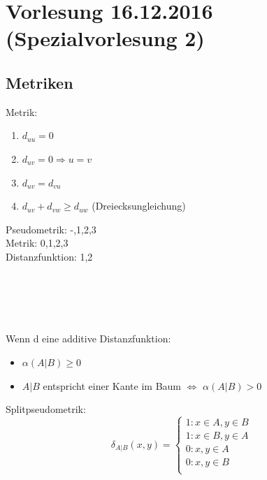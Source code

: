 \section{Vorlesung 16.12.2016 (Spezialvorlesung 2)}
\subsection{Metriken}
Metrik:
\begin{enumerate}
	\item $d_{uu}=0$
	\item $d_{uv}=0 \Rightarrow u=v$
	\item $d_{uv}=d_{vu}$
	\item $d_{uv} + d_{vw} \geq d_{uw}$ (Dreiecksungleichung)
\end{enumerate}

Pseudometrik: -,1,2,3\\
Metrik: 0,1,2,3\\
Distanzfunktion: 1,2\\

\\\\\\
\\\\
Wenn d eine additive Distanzfunktion:
\begin{itemize}
	\item $\alpha (A|B)\geq 0$
	\item $A|B$ entspricht einer Kante im Baum $\Leftrightarrow$ $\alpha (A|B) > 0$
\end{itemize}

Splitpseudometrik:
\begin{equation}
	\delta_{A|B}(x,y)= \begin{cases}
		1:x\in A, y \in B\\
		1:x\in B, y \in A\\
		0:x,y \in A\\
		0:x,y \in B\\
	\end{cases}
\end{equation}

